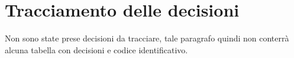 \clearpage
\section{Tracciamento delle decisioni}
Non sono state prese decisioni da tracciare, tale paragrafo quindi non conterrà alcuna tabella con decisioni e codice identificativo. 